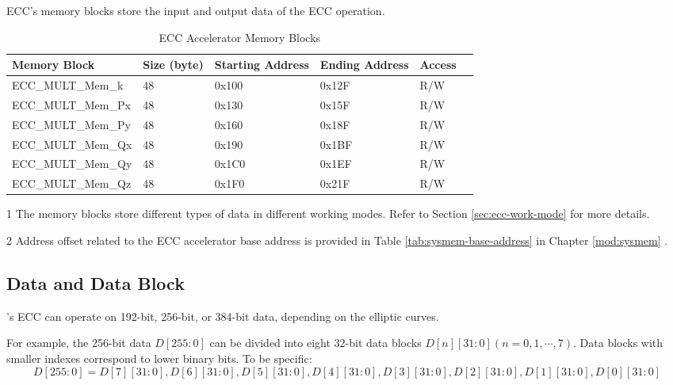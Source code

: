 \documentclass[main\_\_EN.tex]{subfiles}
\begin{document}
ECC's memory blocks store the input and output data of the ECC operation.

\begin{table}[H]
    \centering
    \caption{ECC Accelerator Memory Blocks} \label{tab:ecc-memory}
    \begin{threeparttable}
    \begin{tabular}{ | l | l | l | l | l | l | }
    \hline
        \rowcolor{lightgray}
        \textbf{Memory Block\tnote{1}} & \textbf{Size (byte)}  &  \textbf{Starting Address}\tnote{2} &  \textbf{Ending Address} \tnote{2} & \textbf{Access}   \\ \hline
        ECC\_MULT\_Mem\_k    & 48  & 0x100 & 0x12F & R/W \\ \hline
        ECC\_MULT\_Mem\_Px   & 48  & 0x130 & 0x15F & R/W \\ \hline
        ECC\_MULT\_Mem\_Py   & 48  & 0x160 & 0x18F & R/W \\ \hline
        ECC\_MULT\_Mem\_Qx   & 48  & 0x190 & 0x1BF & R/W \\ \hline
        ECC\_MULT\_Mem\_Qy   & 48  & 0x1C0 & 0x1EF & R/W \\ \hline
        ECC\_MULT\_Mem\_Qz   & 48  & 0x1F0 & 0x21F & R/W \\ \hline
    \end{tabular}
    \begin{tablenotes}
        \item[1] The memory blocks store different types of data in different working modes. Refer to Section \ref{sec:ecc-work-mode} for more details.
        \item[2] Address offset related to the ECC accelerator base address is provided in Table \ref{tab:sysmem-base-address} in Chapter \ref{mod:sysmem} \textit{}.
    \end{tablenotes}
    \end{threeparttable}
\end{table}


\subsection{Data and Data Block}

\chipname{}'s ECC can operate on 192-bit, 256-bit, or 384-bit data, depending on the elliptic curves.

For example, the 256-bit data $D[255:0]$ can be divided into eight 32-bit data blocks $D[n][31:0] (n=0, 1, \cdots, 7)$. Data blocks with smaller indexes correspond to lower binary bits. To be specific:
\[
D[255:0] = {D[7][31:0],D[6][31:0],D[5][31:0],
D[4][31:0],D[3][31:0],D[2][31:0],D[1][31:0],D[0][31:0]}
\]
\end{document}
